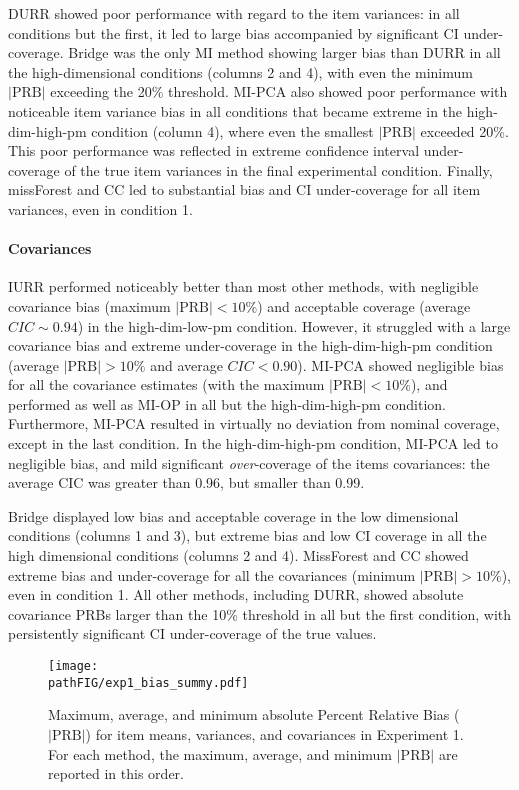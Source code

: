 	DURR showed poor performance with regard to the item variances: in all conditions but the first, it led to 
	large bias accompanied by significant CI under-coverage.
	Bridge was the only MI method showing larger bias than DURR in all the high-dimensional conditions (columns 2 and 4),
	with even the minimum $|\text{PRB}|$ exceeding the 20\% threshold.
	MI-PCA also showed poor performance with noticeable item variance bias in all conditions that became extreme in the
	high-dim-high-pm condition (column 4), where even the smallest $|\text{PRB}|$ exceeded 20\%.
	This poor performance was reflected in extreme confidence interval under-coverage of the true item variances in
	the final experimental condition.
	Finally, missForest and CC led to substantial bias and CI under-coverage for all 
	item variances, even in condition 1.
%
	\paragraph{Covariances}
	IURR performed noticeably better than most other methods, with negligible covariance bias 
	(maximum $|\text{PRB}| < 10\%$) and acceptable coverage (average $CIC \sim 0.94$) in the high-dim-low-pm 
	condition.
	However, it struggled with a large covariance bias and extreme under-coverage in the high-dim-high-pm 
	condition (average $|\text{PRB}| > 10\%$ and average $CIC < 0.90$).
	MI-PCA showed negligible bias for all the covariance estimates (with the maximum $|\text{PRB}| < 10\%$), 
	and performed as well as MI-OP in all but the high-dim-high-pm condition.
	Furthermore, MI-PCA resulted in virtually no deviation from nominal coverage, except in the last condition.
	In the high-dim-high-pm condition, MI-PCA led to negligible bias, and mild significant \emph{over}-coverage 
	of the items covariances: the average CIC was greater than 0.96, but smaller than 0.99.

	Bridge displayed low bias and acceptable coverage in the low dimensional conditions (columns 1 and 3), but 
	extreme bias and low CI coverage in all the high dimensional conditions (columns 2 and 4).
	MissForest and CC showed extreme bias and under-coverage for all the covariances (minimum $|\text{PRB}|>10\%$),
	even in condition 1.
	All other methods, including DURR, showed absolute covariance PRBs larger than the 10\% threshold in all but the 
	first condition, with persistently significant CI under-coverage of the true values.

\begin{figure}
\centering
\texttt{[image: \\pathFIG/exp1\_bias\_summy.pdf]}
\caption{\label{fig:exp1bias}
	Maximum, average, and minimum absolute Percent Relative Bias ($|\text{PRB}|$) for item means, variances, 
	and covariances in Experiment 1.
	For each method, the maximum, average, and minimum $|\text{PRB}|$ are reported in this order.
	}
\end{figure}


